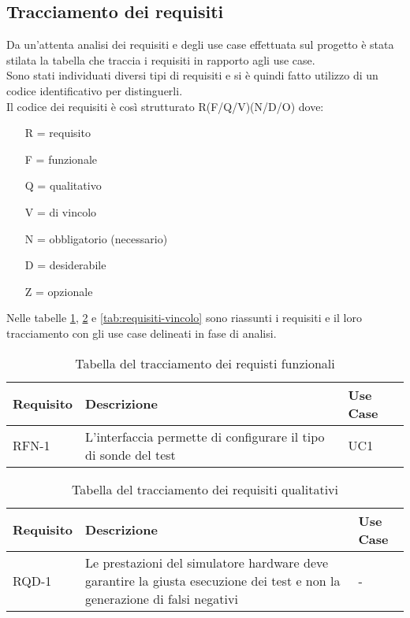 	\subsection{Tracciamento dei requisiti}
	
	Da un'attenta analisi dei requisiti e degli use case effettuata sul progetto è stata stilata la tabella che traccia i requisiti in rapporto agli use case.\\
	Sono stati individuati diversi tipi di requisiti e si è quindi fatto utilizzo di un codice identificativo per distinguerli.\\
	Il codice dei requisiti è così strutturato R(F/Q/V)(N/D/O) dove:
	\begin{enumerate}
		\item[R =] requisito
		\item[F =] funzionale
		\item[Q =] qualitativo
		\item[V =] di vincolo
		\item[N =] obbligatorio (necessario)
		\item[D =] desiderabile
		\item[Z =] opzionale
	\end{enumerate}
	Nelle tabelle \ref{tab:requisiti-funzionali}, \ref{tab:requisiti-qualitativi} e \ref{tab:requisiti-vincolo} sono riassunti i requisiti e il loro tracciamento con gli use case delineati in fase di analisi.
	
	\newpage
	
	\begin{table}%
		\caption{Tabella del tracciamento dei requisti funzionali}
		\label{tab:requisiti-funzionali}
		\begin{tabularx}{\textwidth}{lXl}
			\hline\hline
			\textbf{Requisito} & \textbf{Descrizione} & \textbf{Use Case}\\
			\hline
			RFN-1     & L'interfaccia permette di configurare il tipo di sonde del test & UC1 \\
			\hline
		\end{tabularx}
	\end{table}%
	
	\begin{table}%
		\caption{Tabella del tracciamento dei requisiti qualitativi}
		\label{tab:requisiti-qualitativi}
		\begin{tabularx}{\textwidth}{lXl}
			\hline\hline
			\textbf{Requisito} & \textbf{Descrizione} & \textbf{Use Case}\\
			\hline
			RQD-1    & Le prestazioni del simulatore hardware deve garantire la giusta esecuzione dei test e non la generazione di falsi negativi & - \\
			\hline
		\end{tabularx}
	\end{table}%
	

